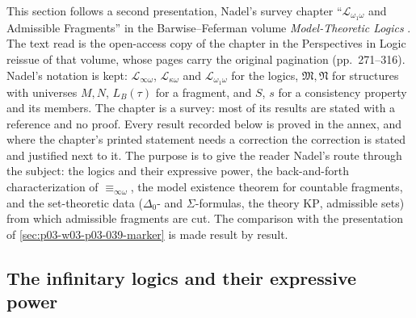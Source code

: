 This section follows a second presentation, Nadel's survey chapter
``\(\mathscr L_{\omega_1\omega}\) and Admissible Fragments'' in the
Barwise--Feferman volume \emph{Model-Theoretic Logics}
\cite{Nadel1985Admissible}. The text read is the open-access copy of the
chapter in the Perspectives in Logic reissue of that volume, whose pages carry
the original pagination (pp.~271--316). Nadel's notation is kept:
\(\mathscr L_{\infty\omega}\), \(\mathscr L_{\kappa\omega}\) and
\(\mathscr L_{\omega_1\omega}\) for the logics, \(\mathfrak M,\mathfrak N\)
for structures with universes \(M,N\), \(L_B(\tau)\) for a fragment, and
\(S\), \(s\) for a consistency property and its members. The chapter is a
survey: most of its results are stated with a reference and no proof. Every
result recorded below is proved in the annex, and where the chapter's
printed statement needs a correction the correction is stated and justified
next to it. The purpose is to give the reader Nadel's route through the
subject: the logics and their expressive power, the back-and-forth
characterization of \(\equiv_{\infty\omega}\), the model existence theorem
for countable fragments, and the set-theoretic data (\(\Delta_0\)- and
\(\Sigma\)-formulas, the theory \(\mathrm{KP}\), admissible sets) from which
admissible fragments are cut. The comparison with the presentation of
\cref{sec:p03-w03-p03-039-marker} is made result by result.

\subsection{The infinitary logics and their expressive power}
\label{sec:p03-w03-p03-039-nadel-logics}

